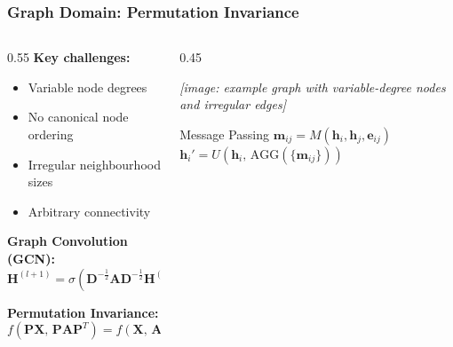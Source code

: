 \begin{frame}[fragile]\frametitle{Graph Domain: Permutation Invariance}

\begin{columns}
\begin{column}{0.55\textwidth}
\textbf{Key challenges:}
\begin{itemize}
\item Variable node degrees
\item No canonical node ordering
\item Irregular neighbourhood sizes
\item Arbitrary connectivity
\end{itemize}

\textbf{Graph Convolution (GCN):}
$$\mathbf{H}^{(l+1)} = \sigma\!\left(\mathbf{D}^{-\frac{1}{2}}\mathbf{A}\mathbf{D}^{-\frac{1}{2}}\mathbf{H}^{(l)}\mathbf{W}^{(l)}\right)$$

\textbf{Permutation Invariance:}
$$f(\mathbf{P}\mathbf{X},\, \mathbf{P}\mathbf{A}\mathbf{P}^T) = f(\mathbf{X},\, \mathbf{A})$$
\end{column}
\begin{column}{0.45\textwidth}
\begin{center}
\textit{[image: example graph with variable-degree nodes and irregular edges]}
\end{center}

\begin{exampleblock}{\small Message Passing}
\small
$\mathbf{m}_{ij} = M(\mathbf{h}_i, \mathbf{h}_j, \mathbf{e}_{ij})$\\
$\mathbf{h}_i' = U\!\left(\mathbf{h}_i,\, \mathrm{AGG}\!\left(\{\mathbf{m}_{ij}\}\right)\right)$
\end{exampleblock}
\end{column}
\end{columns}

\end{frame}

